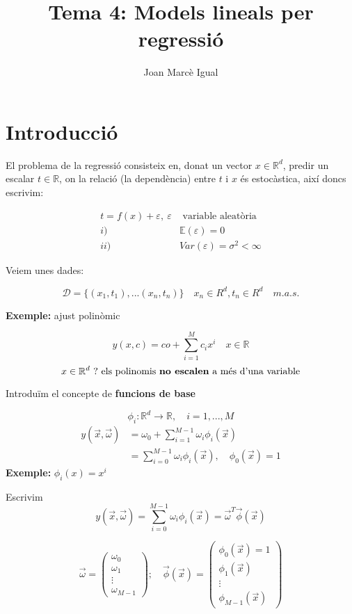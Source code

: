 \documentclass[a4paper]{article}
\title{Tema 4: Models lineals per regressió}
\author{Joan Marcè Igual}
\begin{document}
\maketitle

\section{Introducció}
El problema de la regressió consisteix en, donat un vector $x \in \mathbb{R}^d$, predir un escalar $t \in \mathbb{R}$, on la relació (la dependència) entre $t$ i $x$ és estocàstica, així doncs escrivim:


\begin{align*}
t = f(x) + \varepsilon,\ \varepsilon &\text{ variable aleatòria} \\
i) \quad &\mathbb{E}(\varepsilon) = 0 \\
ii)\quad & Var(\varepsilon) = \sigma^2 < \infty
\end{align*}

Veiem unes dades:

$$
\mathcal{D} = \{ (x_1, t_1), ... (x_n, t_n)  \} \quad x_n \in R^d, t_n \in R^d \quad m.a.s.
$$

\textbf{Exemple:} ajust polinòmic

$$
y(x, c) = co + \sum_{i=1}^M c_i x^i \quad x \in \mathbb{R}
$$
$$
x \in \mathbb{R}^d\ ? \text{ els polinomis \textbf{no escalen} a més d'una variable}
$$

Introduïm el concepte de \textbf{funcions de base}

$$
\phi_i: \mathbb{R}^d \rightarrow \mathbb{R}, \quad i = 1,...,M
$$
\begin{align*}
y(\vec{x}, \vec{\omega}) &= \omega_0 + \sum_{i=1}^{M-1} \omega_i \phi_i (\vec{x}) \\
&=  \sum_{i=0}^{M-1} \omega_i \phi_i (\vec{x}), \quad \phi_0 (\vec{x}) = 1
\end{align*}
\textbf{Exemple:} $\phi_i (x) = x^i$

Escrivim
$$
y(\vec{x}, \vec{\omega}) = \sum_{i=0}^{M-1} \omega_i \phi_i (\vec{x}) = \vec{\omega}^T \vec{\phi} (\vec{x})
$$

$$
\vec{\omega} = 
\begin{pmatrix}
\omega_0 \\ \omega_1 \\ \vdots \\ \omega_{M-1}
\end{pmatrix};\quad
\vec{\phi}(\vec{x}) = 
\begin{pmatrix}
\phi_0 (\vec{x}) = 1 \\
\phi_1 (\vec{x}) \\
\vdots \\
\phi_{M-1} (\vec{x})
\end{pmatrix}
$$
\end{document}
